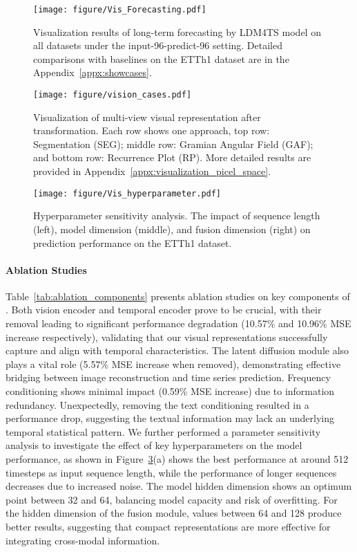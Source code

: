 \begin{figure}[!ht]
  \centering
\texttt{[image: figure/Vis\_Forecasting.pdf]}
  \caption{Visualization results of long-term forecasting by LDM4TS model on all datasets under the input-96-predict-96 setting. Detailed comparisons with baselines on the ETTh1 dataset are in the Appendix~\ref{appx:showcases}.}
\vspace{-2mm}
\label{fig:vis_forecast}
\end{figure}
\begin{figure}[!ht]
  \centering
  \texttt{[image: figure/vision\_cases.pdf]}
  \caption{Visualization of multi-view visual representation after transformation. Each row shows one approach, top row: Segmentation (SEG); middle row: Gramian Angular Field (GAF); and bottom row: Recurrence Plot (RP). More detailed results are provided in Appendix~\ref{appx:visualization_picel_space}.}
\vspace{-1mm}
\label{fig:visual_cases}
\end{figure}
\begin{figure}[!ht]
  \centering
  \texttt{[image: figure/Vis\_hyperparameter.pdf]}
  \caption{Hyperparameter sensitivity analysis. The impact of sequence length (left), model dimension (middle), and fusion dimension (right) on prediction performance on the ETTh1 dataset.}
\label{fig:vis_parameter}
\vspace{-1mm}
\end{figure}
\paragraph{Ablation Studies}
Table~\ref{tab:ablation_components} presents ablation studies on key components of \model. Both vision encoder and temporal encoder prove to be crucial, with their removal leading to significant performance degradation (10.57\% and 10.96\% MSE increase respectively), validating that our visual representations successfully capture and align with temporal characteristics. The latent diffusion module also plays a vital role (5.57\% MSE increase when removed), demonstrating effective bridging between image reconstruction and time series prediction. Frequency conditioning shows minimal impact (0.59\% MSE increase) due to information redundancy. Unexpectedly, removing the text conditioning resulted in a performance drop, suggesting the textual information may lack an underlying temporal statistical pattern.
We further performed a parameter sensitivity analysis to investigate the effect of key hyperparameters on the model performance, as shown in Figure~\ref{fig:vis_parameter}(a) shows the best performance at around 512 timesteps as input sequence length, while the performance of longer sequences decreases due to increased noise. The model hidden dimension shows an optimum point between 32 and 64, balancing model capacity and risk of overfitting. For the hidden dimension of the fusion module, values between 64 and 128 produce better results, suggesting that compact representations are more effective for integrating cross-modal information.